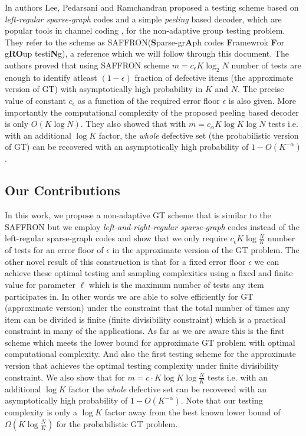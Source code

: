 \documentclass[conference,,twocolumn]{IEEEtran}
\begin{document}
In \cite{lee2015saffron} authors Lee, Pedarsani and Ramchandran proposed a testing scheme based on \textit{left-regular sparse-graph} codes and a simple \textit{peeling} based decoder, which are popular tools in channel coding \cite{richardson2008modern}, for the non-adaptive group testing problem. They refer to the scheme as SAFFRON(\textbf{S}parse-gr\textbf{A}ph codes \textbf{F}ramewrok \textbf{F}or g\textbf{RO}up testi\textbf{N}g), a reference which we will follow through this document. The authors proved that using SAFFRON scheme $m=c_\epsilon K\log_2 N$ number of tests are enough to identify atleast $(1-\epsilon)$ fraction of defective items (the approximate version of GT) with asymptotically high probability in $K$ and $N$. The precise value of constant $c_\epsilon$ as a function of the required error floor $\epsilon$ is also given. More importantly the computational complexity of the proposed peeling based decoder is only $O(K\log N)$. They also showed that with $m=c_\alpha K\log K \log N$ tests  i.e. with an additional $\log K$ factor, the \textit{whole} defective set (the probabilistic version of GT) can be recovered with an asymptotically high probability of $1-O(K^{-\alpha})$.

\subsection*{Our Contributions}
In this work, we propose a non-adaptive GT scheme that is similar to the SAFFRON but we employ \textit{left-and-right-regular sparse-graph} codes instead of the left-regular sparse-graph codes and show that we only require $c_\epsilon K\log \frac{N}{K}$ number of tests for an error floor of $\epsilon$ in the approximate version of the GT problem. The other novel result of this construction is that for a fixed error floor $\epsilon$ we can achieve these optimal testing and sampling complexities using a fixed and finite value for parameter $\ell$ which is the maximum number of tests any item participates in. In other words we are able to solve efficiently for GT (approximate version) under the constraint that the total number of times any item can be divided is finite (finite divisibility constraint)\cite{gandikotanearly} which is a practical constraint in many of the applications. As far as we are aware this is the first scheme which meets the lower bound for approximate GT problem with optimal computational complexity. And also the first testing scheme for the approximate version that achieves the optimal testing complexity under finite divisibility constraint. We also show that for $m=c\cdot K\log K \log \frac{N}{K}$ tests  i.e. with an additional $\log K$ factor the \textit{whole} defective set can be recovered with an asymptotically high probability of $1-O(K^{-\alpha})$. Note that our testing complexity is only a $\log K$ factor away from the best known lower bound of $\Omega(K\log \frac{N}{K})$ \cite{chan2014non} for the probabilistic GT problem.
\end{document}
